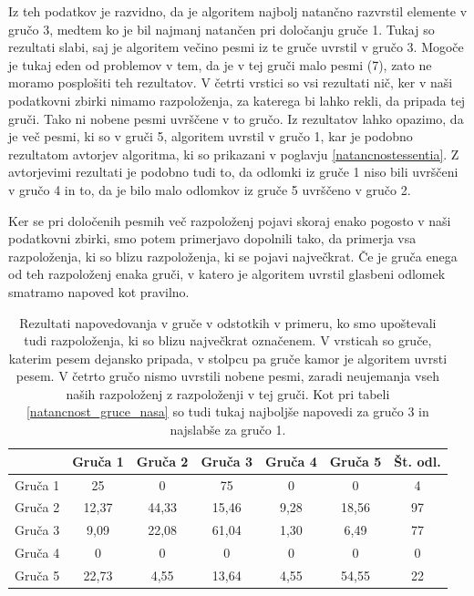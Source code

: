 \documentclass[a4paper, 12pt]{book}
\begin{document}
{Iz teh podatkov je razvidno, da je algoritem najbolj natančno razvrstil elemente v gručo 3, medtem ko je bil najmanj natančen pri določanju gruče 1. Tukaj so rezultati slabi, saj je algoritem večino pesmi iz te gruče uvrstil v gručo 3. Mogoče je tukaj eden od problemov v tem, da je v tej gruči malo pesmi (7), zato ne moramo posplošiti teh rezultatov. V četrti vrstici so vsi rezultati nič, ker v naši podatkovni zbirki nimamo razpoloženja, za katerega bi lahko rekli, da pripada tej gruči. Tako ni nobene pesmi uvrščene v to gručo. Iz rezultatov lahko opazimo, da je več pesmi, ki so v gruči 5, algoritem uvrstil v gručo 1, kar je podobno rezultatom avtorjev algoritma, ki so prikazani v poglavju \ref{natancnostessentia}. Z avtorjevimi rezultati je podobno tudi to, da odlomki iz gruče 1 niso bili uvrščeni v gručo 4 in to, da je bilo malo odlomkov iz gruče 5 uvrščeno v gručo 2.

Ker se pri določenih pesmih več razpoloženj pojavi skoraj enako pogosto v naši podatkovni zbirki, smo potem primerjavo dopolnili tako, da primerja vsa razpoloženja, ki so blizu razpoloženja, ki se pojavi največkrat. Če je gruča enega od teh razpoloženj enaka gruči, v katero je algoritem uvrstil glasbeni odlomek smatramo napoved kot pravilno. 

\begin{table}[htb]
\begin{center}
\caption{Rezultati napovedovanja v gruče v odstotkih v primeru, ko smo upoštevali tudi razpoloženja, ki so blizu največkrat označenem. V vrsticah so gruče, katerim pesem dejansko pripada, v stolpcu pa gruče kamor je algoritem uvrsti pesem. V četrto gručo nismo uvrstili nobene pesmi, zaradi neujemanja vseh naših razpoloženj z razpoloženji v tej gruči. Kot pri tabeli \ref{natancnost_gruce_nasa} so tudi tukaj najboljše napovedi za gručo 3 in najslabše za gručo 1. }
\begin{tabular}{|l|c|c|c|c|c|c|}
\hline
 & Gruča 1 & Gruča 2 & Gruča 3 & Gruča 4 & Gruča 5 & Št. odl.\\ \hline
Gruča 1 & 25 & 0	& 75 & 0 & 0 & 4\\ \hline
Gruča 2 & 12,37 & 44,33 & 15,46 & 9,28 & 18,56 & 97\\ \hline
Gruča 3 & 9,09 & 22,08 & 61,04 & 1,30 & 6,49 & 77\\ \hline
Gruča 4 & 0	& 0 & 0 & 0 & 0 & 0\\ \hline
Gruča 5 & 22,73	& 4,55 & 13,64 & 4,55 & 54,55 & 22 \\ \hline

\hline
\end{tabular}
\label{natancnost_gruce_nasa_with_second}
\end{center}
\end{table}

}
\end{document}
